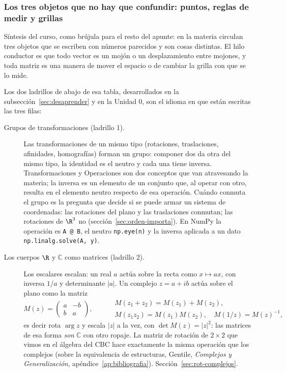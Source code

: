 \subsubsection{Los tres objetos que no hay que confundir: puntos, reglas de medir y grillas}\label{sec:puntos-formas-grillas}

{\small\vspace{1mm}\par}

Síntesis del curso, como brújula para el resto del apunte: en la materia circulan tres objetos
que se escriben con números parecidos y son cosas distintas. El hilo conductor es que
todo vector es un mojón o un desplazamiento entre mojones, y toda matriz es una manera de
mover el espacio o de cambiar la grilla con que se lo mide.

Los dos ladrillos de abajo de esa tabla, desarrollados en la subsección~\ref{sec:desaprender}
y en la Unidad 0, son el idioma en que están escritas las tres filas:

\begin{description}
  \item[Grupos de transformaciones (ladrillo 1).] Las transformaciones de un mismo tipo
  (rotaciones, traslaciones, afinidades, homografías) forman un grupo: componer dos da otra
  del mismo tipo, la identidad es el neutro y cada una tiene inversa. Transformaciones y
  Operaciones son dos conceptos que van atravesando la materia; la inversa es un elemento
  de un conjunto que, al operar con otro, resulta en el elemento neutro respecto de esa
  operación. Cuándo conmuta el
  grupo es la pregunta que decide si se puede armar un sistema de coordenadas: las
  rotaciones del plano y las traslaciones conmutan; las rotaciones de \(\R^3\) no
  (sección~\ref{sec:orden-importa}). En NumPy la operación es \texttt{A @ B}, el neutro
  \texttt{np.eye(n)} y la inversa aplicada a un dato \texttt{np.linalg.solve(A, y)}.
  \item[Los cuerpos \(\R\) y \(\mathbb{C}\) como matrices (ladrillo 2).] Los escalares
  escalan: un real \(a\) actúa sobre la recta como \(x\mapsto ax\), con inversa \(1/a\) y
  determinante \(|a|\). Un complejo \(z=a+ib\) actúa sobre el plano como la matriz
  \[
    M(z)=\begin{pmatrix}a&-b\\ b&a\end{pmatrix},\qquad
    \begin{aligned}
      &M(z_1+z_2)=M(z_1)+M(z_2),\\
      &M(z_1z_2)=M(z_1)M(z_2),\quad M(1/z)=M(z)^{-1},
    \end{aligned}
  \]
  es decir rota \(\arg z\) y escala \(|z|\) a la vez, con \(\det M(z)=|z|^2\): las matrices
  de esa forma \emph{son} \(\mathbb{C}\) con otro ropaje. La matriz de rotación de \(2\times2\) que
  vimos en el álgebra del CBC hace exactamente la misma operación que los
  complejos (sobre la equivalencia de estructuras, Gentile,
  \emph{Complejos y Generalización}, apéndice~\ref{ap:bibliografia}). Sección~\ref{sec:rot-complejos}.
\end{description}

